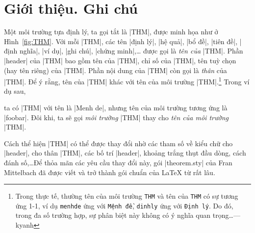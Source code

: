\section{Giới thiệu. Ghi chú}

Một môi trường tựa định lý, ta gọi tắt là |THM|, được minh họa
như ở Hình~\ref{fig:THM}. Với mỗi |THM|, các tên |định lý|, |hệ quả|, |bổ đề|, |tiên đề|,
|định nghĩa|, |ví dụ|, |ghi chú|, |chứng minh|,\ldots
được gọi là \emph{tên của} |THM|.
Phần |header| của |THM| bao gồm tên của |THM|, chỉ số của |THM|,
tên tuỳ chọn (hay tên riêng) của |THM|. Phần nội dung của |THM|
còn gọi là \emph{thân} của |THM|. Để ý rằng, tên của |THM| khác
với tên của môi trường |THM|.\footnote{Trong thực tế, thường tên
của môi trường \texttt{THM} và tên của \texttt{THM} có sự tương ứng
1-1, ví dụ \texttt{menhde} ứng với \texttt{Mệnh đề},
\texttt{dinhly} ứng với \texttt{Định lý}. Do đó, trong đa số trường hợp,
sự phân biệt này không có ý nghĩa quan trọng\ldots --- kyanh}
Trong ví dụ sau,
\begin{example}
  \newtheorem{foobar}{Menh de}
\end{example}
ta có |THM| với tên là |Menh de|, nhưng tên của môi trường
tương ứng là |foobar|. Đôi khi, ta sẽ gọi \emph{môi trường} |THM| thay cho
\emph{tên của môi trường} |THM|.

\medskip
Cách thể hiện |THM| có thể được thay đổi nhờ các tham số về
kiểu chữ cho |header|, cho thân |THM|, các bố trí |header|, khoảng trắng
thụt đầu dòng, cách đánh số,\ldots Để thỏa mãn các yêu cầu thay đổi này,
gói |theorem.sty| của Fran Mittelbach đã được viết và trở thành
gói chuẩn của \LaTeX{} từ rất lâu.

